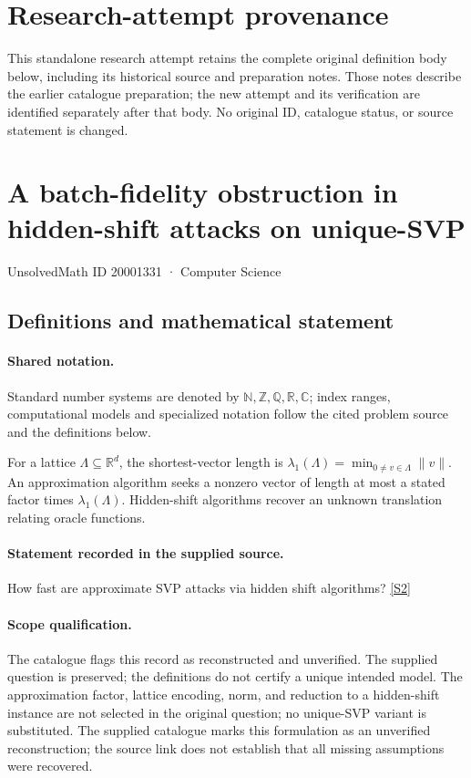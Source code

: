 \documentclass[11pt]{article}
\begin{document}
\section*{Research-attempt provenance}
This standalone research attempt retains the complete original definition body below,
including its historical source and preparation notes. Those notes describe the
earlier catalogue preparation; the new attempt and its verification are identified
separately after that body. No original ID, catalogue status, or source statement is changed.

\section{A batch-fidelity obstruction in hidden-shift attacks on unique-SVP}\label{20001331}
{\small UnsolvedMath ID 20001331 · Computer Science}
\subsection{Definitions and mathematical statement}

\paragraph{Shared notation.}Standard number systems are denoted by $\mathbb N,\mathbb Z,\mathbb Q,\mathbb R,\mathbb C$; index ranges, computational models and specialized notation follow the cited problem source and the definitions below.


For a lattice $\Lambda\subseteq\mathbb R^d$, the shortest-vector length is $\lambda_1(\Lambda)=\min_{0\ne v\in\Lambda}\|v\|$. An approximation algorithm seeks a nonzero vector of length at most a stated factor times $\lambda_1(\Lambda)$. Hidden-shift algorithms recover an unknown translation relating oracle functions.
\paragraph{Statement recorded in the supplied source.}
How fast are approximate SVP attacks via hidden shift algorithms? \href{http://aimpl.org/quantumalg/4/}{[S2]}
\paragraph{Scope qualification.}
The catalogue flags this record as reconstructed and unverified. The supplied question is preserved; the definitions do not certify a unique intended model. The approximation factor, lattice encoding, norm, and reduction to a hidden-shift instance are not selected in the original question; no unique-SVP variant is substituted.
The supplied catalogue marks this formulation as an unverified reconstruction; the source link does not establish that all missing assumptions were recovered.
\end{document}
